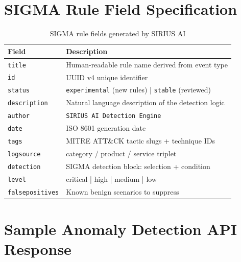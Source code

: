 \documentclass[12pt,a4paper]{article}
\begin{document}
\section{SIGMA Rule Field Specification}

\begin{table}[H]
\centering
\caption{SIGMA rule fields generated by SIRIUS AI}
\begin{tabular}{lp{9.5cm}}
\toprule
\textbf{Field} & \textbf{Description} \\
\midrule
\texttt{title}         & Human-readable rule name derived from event type \\
\texttt{id}            & UUID v4 unique identifier \\
\texttt{status}        & \texttt{experimental} (new rules) | \texttt{stable} (reviewed) \\
\texttt{description}   & Natural language description of the detection logic \\
\texttt{author}        & \texttt{SIRIUS AI Detection Engine} \\
\texttt{date}          & ISO 8601 generation date \\
\texttt{tags}          & MITRE ATT\&CK tactic slugs + technique IDs \\
\texttt{logsource}     & category / product / service triplet \\
\texttt{detection}     & SIGMA detection block: selection + condition \\
\texttt{level}         & critical | high | medium | low \\
\texttt{falsepositives} & Known benign scenarios to suppress \\
\bottomrule
\end{tabular}
\end{table}

\section{Sample Anomaly Detection API Response}
\end{document}

